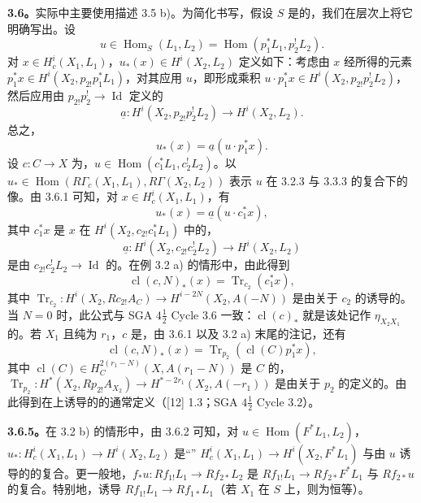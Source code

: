 \textbf{3.6。}实际中主要使用描述 3.5 b)。为简化书写，假设 $S$ 是的，我们在层次上将它明确写出。设
\[
u\in\operatorname{Hom}_S(L_1,L_2)=\operatorname{Hom}(p_1^*L_1,p_2^!L_2).
\]
对 $x\in H_c^i(X_1,L_1)$，$u_*(x)\in H^i(X_2,L_2)$ 定义如下：考虑由 $x$ 经所得的元素 $p_1^*x\in H^i(X_2,p_{2!}p_1^*L_1)$，对其应用 $u$，即形成乘积 $u\cdot p_1^*x\in H^i(X_2,p_{2!}p_2^!L_2)$，然后应用由 $p_{2!}p_2^!\to\operatorname{Id}$ 定义的
\[
\underline a:H^i(X_2,p_{2!}p_2^!L_2)\longrightarrow H^i(X_2,L_2).
\]
总之，
\[
u_*(x)=\underline a(u\cdot p_1^*x).\tag{3.6.1}
\]
设 $c:C\to X$ 为，$u\in\operatorname{Hom}(c_1^*L_1,c_2^!L_2)$。以 $u_*\in\operatorname{Hom}(R\Gamma_c(X_1,L_1),R\Gamma(X_2,L_2))$ 表示 $u$ 在 3.2.3 与 3.3.3 的复合下的像。由 3.6.1 可知，对 $x\in H_c^i(X_1,L_1)$，有
\[
u_*(x)=\underline a(u\cdot c_1^*x),\tag{3.6.2}
\]
其中 $c_1^*x$ 是 $x$ 在 $H^i(X_2,c_{2!}c_1^*L_1)$ 中的，
\[
\underline a:H^i(X_2,c_{2!}c_2^!L_2)\longrightarrow H^i(X_2,L_2)
\]
是由 $c_{2!}c_2^!L_2\to\operatorname{Id}$ 的。在例 3.2 a) 的情形中，由此得到
\[
\operatorname{cl}(c,N)_*(x)=\operatorname{Tr}_{c_2}(c_1^*x),\tag{3.6.3}
\]
其中 $\operatorname{Tr}_{c_2}:H^i(X_2,Rc_{2!}A_C)\to H^{i-2N}(X_2,A(-N))$ 是由关于 $c_2$ 的诱导的。当 $N=0$ 时，此公式与 SGA $4\frac12$ Cycle 3.6 一致：$\operatorname{cl}(c)_*$ 就是该处记作 $\eta_{X_2X_1}$ 的。若 $X_1$ 且纯为 $r_1$，$c$ 是，由 3.6.1 以及 3.2 a) 末尾的注记，还有
\[
\operatorname{cl}(c,N)_*(x)=\operatorname{Tr}_{p_2}(\operatorname{cl}(C)p_1^*x),\tag{3.6.4}
\]
其中 $\operatorname{cl}(C)\in H_C^{2(r_1-N)}(X,A(r_1-N))$ 是 $C$ 的，$\operatorname{Tr}_{p_2}:H^*(X_2,Rp_{2!}A_{X_2})\to H^{*-2r_1}(X_2,A(-r_1))$ 是由关于 $p_2$ 的定义的。由此得到在上诱导的的通常定义（[12] 1.3；SGA $4\frac12$ Cycle 3.2）。

\textbf{3.6.5。}在 3.2 b) 的情形中，由 3.6.2 可知，对 $u\in\operatorname{Hom}(F^*L_1,L_2)$，$u_*:H_c^i(X_1,L_1)\to H^i(X_2,L_2)$ 是“” $H_c^i(X_1,L_1)\to H^i(X_2,F^*L_1)$ 与由 $u$ 诱导的的复合。更一般地，$f_*u:Rf_{1!}L_1\to Rf_{2*}L_2$ 是 $Rf_{1!}L_1\to Rf_{2*}F^*L_1$ 与 $Rf_{2*}u$ 的复合。特别地，诱导 $Rf_{1!}L_1\to Rf_{1*}L_1$（若 $X_1$ 在 $S$ 上，则为恒等）。

